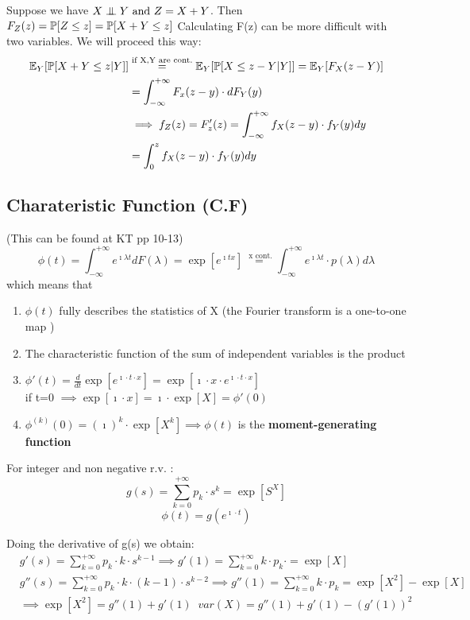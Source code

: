Suppose we have $X \mathrel{\perp\mspace{-10mu}\perp} Y \text{ and } Z=X+Y$. Then $F_Z(z) = \mathbb{P}[Z\le z] = \mathbb{P}[X+Y \le z]$
Calculating F(z) can be more difficult with two variables. We will proceed this way:
\\
\begin{equation}\begin{split}
    \mathbb{E}_{Y}[\mathbb{P}[X+Y \le z | Y]]  &\stackrel{\text{if X,Y are cont.}}{=} \mathbb{E}_Y [\mathbb{P}[X \le z - Y | Y]] = \mathbb{E}_Y[F_X(z-Y)]\\
    &=\int_{-\infty}^{+\infty}F_x(z-y) \cdot dF_Y(y) \\
    &\implies f_Z(z) = F'_z(z) = \int_{-\infty}^{+\infty}{f_X(z-y)\cdot f_Y(y) dy} \\
    &=\int_{0}^{z}{f_X(z-y) \cdot f_Y(y) dy}
  \end{split}
\end{equation}


\subsection{Charateristic Function (C.F)}
(This can be found at KT pp 10-13)
\begin{equation}\phi(t) = \int_{-\infty}^{+\infty}e^{\imath \lambda t} dF(\lambda) = \exp[e^{\imath t x}]\stackrel{\text{ x cont.}}{=}
  \int_{-\infty}^{+\infty}e^{\imath \lambda t} \cdot p(\lambda) d\lambda
\end{equation}
which means that
\begin{enumerate}
  \item $\phi(t)$ fully describes the statistics of X (the Fourier transform is a  one-to-one map )
  \item The characteristic function of the sum of independent variables is the product
  \item $\phi'(t)=\frac{d}{dt} \exp[e^{\imath \cdot t \cdot x}]=\exp[\imath \cdot x \cdot e^{\imath \cdot t \cdot x}]$ \\
  if t=0 $\implies \exp[\imath \cdot x]=\imath \cdot \exp[ X] = \phi'(0)$
  \item $\phi^{(k)}(0) = (\imath)^k \cdot \exp[X^k] \implies \phi(t)$ is the \textbf{moment-generating function}
\end{enumerate}


For integer and non negative r.v. :
$$g(s)=\sum\limits_{k=0}^{+\infty}p_k \cdot s^k = \exp[S^X]$$
$$\phi(t) = g(e^{\imath \cdot t})$$

Doing the derivative of g(s) we obtain:
\begin{equation}
  \begin{split}
    & g'(s) = \sum\limits_{k=0}^{+\infty} p_k \cdot k \cdot s^{k-1}
    \implies g'(1) = \sum\limits_{k=0}^{+\infty} k \cdot p_k \cdot = \exp[X] \\
    & g''(s) = \sum\limits_{k=0}^{+\infty} p_k \cdot k \cdot (k-1) \cdot s^{k-2}
    \implies g''(1) = \sum\limits_{k=0}^{+\infty} k \cdot p_k = \exp[X^2]-\exp[X] \\
    &\implies \exp[X^2] = g''(1)+g'(1) \; \; var(X) = g''(1)+g'(1)-(g'(1))^2
  \end{split}
\end{equation}

